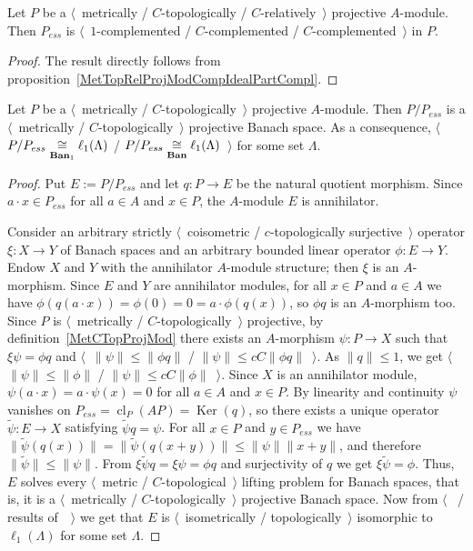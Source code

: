 \begin{corollary}\label{MetTopRelProjModPartCompl} Let $P$ 
be a $\langle$~metrically / $C$-topologically / $C$-relatively~$\rangle$ 
projective $A$-module. Then $P_{ess}$ 
is $\langle$~$1$-complemented / $C$-complemented / $C$-complemented~$\rangle$ 
in $P$.
\end{corollary}
\begin{proof} The result directly follows from 
proposition~\ref{MetTopRelProjModCompIdealPartCompl}.
\end{proof}

\begin{proposition}\label{MetTopProjModEssQuotIsProjBanSp} Let $P$ be a
$\langle$~metrically / $C$-topologically~$\rangle$ projective $A$-module. Then
$P/P_{ess}$ is a $\langle$~metrically / $C$-topologically~$\rangle$ projective
Banach space. As a consequence,
$\langle$~$P/P_{ess}\mathrel{\mathop{\cong}\limits_{\mathbf{Ban}_1}}\ell_1(\Lambda)$ /
$P/P_{ess}\mathrel{\mathop{\cong}\limits_{\mathbf{Ban}}}\ell_1(\Lambda)$~$\rangle$ for some set $\Lambda$.
\end{proposition}
\begin{proof} Put $E:=P/P_{ess}$ and let $q:P\to E$ be the natural quotient
morphism. Since $a\cdot x\in P_{ess}$ for all $a\in A$ and $x\in P$, the
$A$-module $E$ is annihilator.

Consider an arbitrary strictly $\langle$~coisometric /
$c$-topologically surjective~$\rangle$ operator $\xi:X\to Y$ of Banach spaces
and an arbitrary bounded linear operator $\phi:E\to Y$. Endow $X$ and $Y$
with the annihilator $A$-module structure; then $\xi$ is an $A$-morphism.
Since $E$ and $Y$ are annihilator modules, for all $x\in P$ and $a\in A$ we
have $\phi(q(a\cdot x))=\phi(0)=0=a\cdot\phi(q(x))$, so $\phi q$ is an
$A$-morphism too. Since $P$ is $\langle$~metrically /
$C$-topologically~$\rangle$ projective, by definition~\ref{MetCTopProjMod}
there exists an $A$-morphism $\psi:P\to X$ such that $\xi\psi=\phi q$
and $\langle$~$\lVert\psi\rVert\leq\lVert\phi q\rVert$ /
$\lVert\psi\rVert\leq cC\lVert\phi q\rVert$~$\rangle$. As $\lVert q\rVert\leq 1$, 
we get $\langle$~$\lVert\psi\rVert\leq\lVert\phi\rVert$ /
$\lVert\psi\rVert\leq cC\lVert\phi \rVert$~$\rangle$. Since $X$ is an 
annihilator module, $\psi(a\cdot x)=a\cdot\psi(x)=0$ for all $a\in A$ 
and $x\in P$. By linearity and continuity $\psi$ vanishes on 
$P_{ess}=\operatorname{cl}_P(AP)=\operatorname{Ker}(q)$, so there exists a
unique operator $\widetilde{\psi}:E\to X$ satisfying
$\widetilde{\psi}q=\psi$. For all $x\in P$ and $y\in P_{ess}$ we have
$\lVert\widetilde{\psi}(q(x))\rVert
=\lVert\widetilde{\psi}(q(x+y))\rVert
\leq\lVert\psi\rVert\lVert x+y\rVert$, and
therefore $\lVert\widetilde{\psi}\rVert\leq\lVert\psi\rVert$.
From $\xi\widetilde{\psi}q=\xi\psi=\phi q$ and surjectivity of $q$ we
get $\xi\widetilde{\psi}=\phi$. Thus, $E$ solves every $\langle$~metric /
$C$-topological~$\rangle$ lifting problem for Banach spaces, that is, it is a
$\langle$~metrically / $C$-topologically~$\rangle$ projective Banach space.
Now from $\langle$~\cite[proposition 3.2]{HelMetrFrQMod} / results
of~\cite{KotheTopProjBanSp}~$\rangle$ we get that $E$ is
$\langle$~isometrically / topologically~$\rangle$ isomorphic
to $\ell_1(\Lambda)$ for some set $\Lambda$.
\end{proof}

